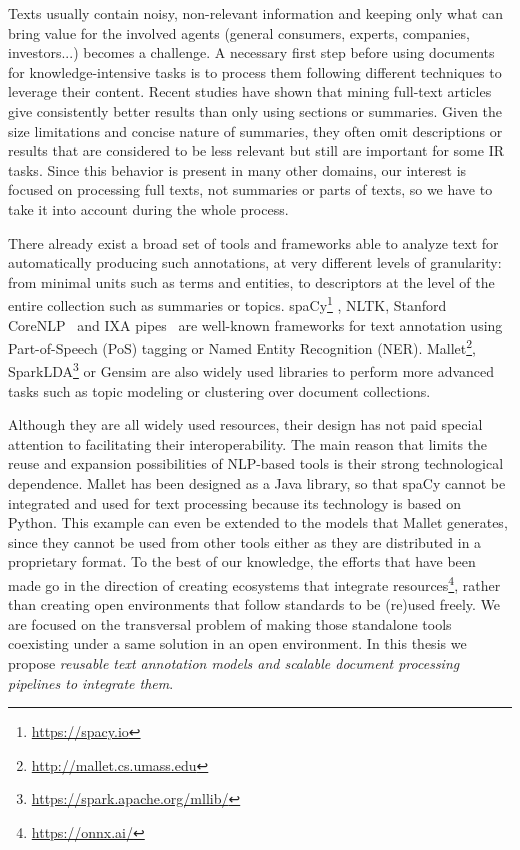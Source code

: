 Texts usually contain noisy, non-relevant information and keeping only what can bring value for the involved agents (general consumers, experts, companies, investors...) becomes a challenge. A necessary first step before using documents for knowledge-intensive tasks is to process them following different techniques to leverage their content. Recent studies \cite{Westergaard2017}\cite{Sciences2016} have shown that mining full-text articles give consistently better results than only using sections or summaries. Given the size limitations and concise nature of summaries, they often omit descriptions or results that are considered to be less relevant but still are important for some IR tasks\cite{Divoli2012}.  Since this behavior is present in many other domains, our interest is focused on processing full texts, not summaries or parts of texts, so we have to take it into account during the whole process.

There already exist a broad set of tools and frameworks able to analyze text for automatically producing such annotations, at very different levels of granularity: from minimal units such as terms and entities, to descriptors at the level of the entire collection such as  summaries or topics. spaCy\footnote{\url{https://spacy.io}} , NLTK, Stanford CoreNLP~\cite{Manning2014TheToolkit} and IXA pipes~\cite{Agerri2014} are well-known frameworks for text annotation using Part-of-Speech (PoS) tagging or Named Entity Recognition (NER). Mallet\footnote{\url{http://mallet.cs.umass.edu}},  SparkLDA\footnote{\url{https://spark.apache.org/mllib/}} or Gensim are also widely used libraries to perform more advanced tasks such as topic modeling or clustering over document collections. 

Although they are all widely used resources, their design has not paid special attention to facilitating their interoperability. The main reason that limits the reuse and expansion possibilities of NLP-based tools is their strong technological dependence. Mallet has been designed as a Java library, so that spaCy cannot be integrated and used for text processing because its technology is based on Python. This example can even be extended to the models that Mallet generates, since they cannot be used from other tools either as they are distributed in a proprietary format. To the best of our knowledge, the efforts that have been made go in the direction of creating ecosystems that integrate resources\footnote{\url{https://onnx.ai/}}, rather than creating open environments that follow standards to be (re)used freely. We are focused on the transversal problem of making those standalone tools coexisting under a same solution in an open environment. In this thesis we propose \textit{reusable text annotation models and scalable document processing pipelines to integrate them}.  
 


